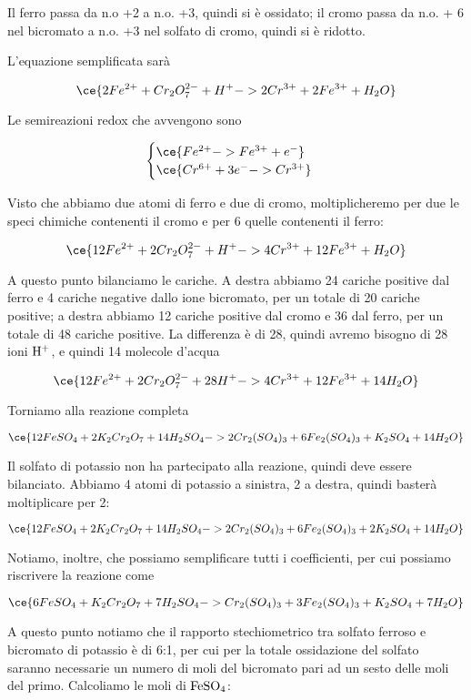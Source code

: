 Il ferro passa da n.o +2 a n.o. +3, quindi si è ossidato; il cromo passa da n.o. + 6 nel bicromato a n.o. +3 nel solfato di cromo, quindi si è ridotto.

L'equazione semplificata sarà

$$\ce{2Fe^{2+} + Cr_2O_7^{2-} + H^+ -> 2Cr^{3+} + 2Fe^{3+} + H_2O}$$

Le semireazioni redox che avvengono sono

$$\begin{cases}
    \ce{Fe^{2+} -> Fe^{3+} + e^-}\\
    \ce{Cr^{6+} + 3e^- -> Cr^{3+}}
\end{cases}$$

Visto che abbiamo due atomi di ferro e due di cromo, moltiplicheremo per due le speci chimiche contenenti il cromo e per 6 quelle contenenti il ferro:

$$\ce{12Fe^{2+} + 2Cr_2O_7^{2-} + H^+ -> 4Cr^{3+} + 12Fe^{3+} + H_2O}$$

A questo punto bilanciamo le cariche. A destra abbiamo 24 cariche positive dal ferro e 4 cariche negative dallo ione bicromato, per un totale di 20 cariche positive; a destra abbiamo 12 cariche positive dal cromo e 36 dal ferro, per un totale di 48 cariche positive. La differenza è di 28, quindi avremo bisogno di 28 ioni $\rm H^+$, e quindi 14 molecole d'acqua

$$\ce{12Fe^{2+} + 2Cr_2O_7^{2-} + 28H^+ -> 4Cr^{3+} + 12Fe^{3+} + 14H_2O}$$

Torniamo alla reazione completa

$$\ce{12FeSO_4 + 2K_2Cr_2O_7 + 14H_2SO_4 -> 2Cr_2(SO_4)_3 + 6Fe_2(SO_4)_3 + K_2SO_4 + 14H_2O}$$

Il solfato di potassio non ha partecipato alla reazione, quindi deve essere bilanciato. Abbiamo 4 atomi di potassio a sinistra, 2 a destra, quindi basterà moltiplicare per 2:

$$\ce{12FeSO_4 + 2K_2Cr_2O_7 + 14H_2SO_4 -> 2Cr_2(SO_4)_3 + 6Fe_2(SO_4)_3 + 2K_2SO_4 + 14H_2O}$$

Notiamo, inoltre, che possiamo semplificare tutti i coefficienti, per cui possiamo riscrivere la reazione come

$$\ce{6FeSO_4 + K_2Cr_2O_7 + 7H_2SO_4 -> Cr_2(SO_4)_3 + 3Fe_2(SO_4)_3 + K_2SO_4 + 7H_2O}$$

A questo punto notiamo che il rapporto stechiometrico tra solfato ferroso e bicromato di potassio è di 6:1, per cui per la totale ossidazione del solfato saranno necessarie un numero di moli del bicromato pari ad un sesto delle moli del primo. Calcoliamo le moli di $\rm FeSO_4$:

